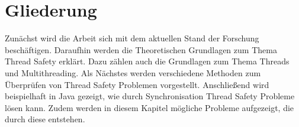 \section{Gliederung}

Zunächst wird die Arbeit sich mit dem aktuellen Stand der Forschung beschäftigen. Daraufhin werden die Theoretischen Grundlagen zum Thema Thread Safety erklärt. Dazu zählen auch die Grundlagen zum Thema Threads und Multithreading. Als Nächstes werden verschiedene Methoden zum Überprüfen von Thread Safety Problemen vorgestellt. Anschließend wird beispielhaft in Java gezeigt, wie durch Synchronisation Thread Safety Probleme lösen kann. Zudem werden in diesem Kapitel mögliche Probleme aufgezeigt, die durch diese entstehen.